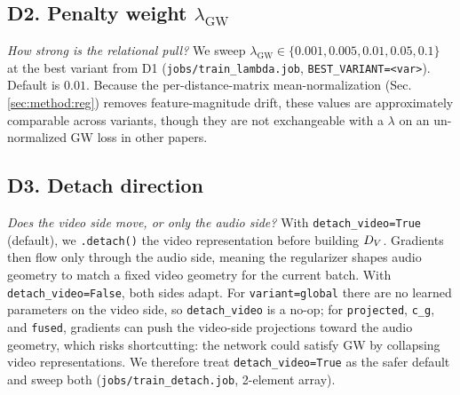 \subsection*{D2. Penalty weight $\lambda_{\mathrm{GW}}$}
\emph{How strong is the relational pull?}
We sweep $\lambda_{\mathrm{GW}} \in \{0.001, 0.005, 0.01, 0.05,
0.1\}$ at the best variant from D1 (\texttt{jobs/train\_lambda.job},
\texttt{BEST\_VARIANT=<var>}). Default is $0.01$. Because the
per-distance-matrix mean-normalization (Sec.\,\ref{sec:method:reg})
removes feature-magnitude drift, these values are approximately
comparable across variants, though they are not exchangeable with a
$\lambda$ on an un-normalized GW loss in other papers.

\subsection*{D3. Detach direction}
\emph{Does the video side move, or only the audio side?}
With \texttt{detach\_video=True} (default), we
\texttt{.detach()} the video representation before building
$D_{V}$. Gradients then flow only through the audio side, meaning the
regularizer shapes audio geometry to match a fixed video geometry
for the current batch. With \texttt{detach\_video=False}, both
sides adapt. For \texttt{variant=global} there are no learned
parameters on the video side, so \texttt{detach\_video} is a
no-op; for \texttt{projected}, \texttt{c\_g}, and \texttt{fused},
gradients can push the video-side projections toward the audio
geometry, which risks shortcutting: the network could satisfy GW
by collapsing video representations. We therefore treat
\texttt{detach\_video=True} as the safer default and sweep both
(\texttt{jobs/train\_detach.job}, 2-element array).


